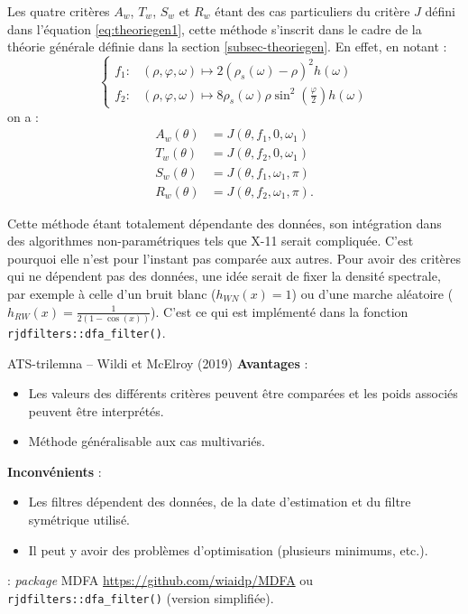 \documentclass[
  12pt,
  french,
  12pt,a4paper]{article}
\newcommand\1{\mathds{1}}
\begin{document}
Les quatre critères \(A_w\), \(T_w\), \(S_w\) et \(R_w\) étant des cas particuliers du critère \(J\) défini dans l'équation \eqref{eq:theoriegen1}, cette méthode s'inscrit dans le cadre de la théorie générale définie dans la section \ref{subsec-theoriegen}.
En effet, en notant :
\[
\begin{cases}
    f_1\colon&(\rho,\varphi, \omega)\mapsto2\left(\rho_s(\omega)-\rho\right)^{2}h(\omega) \\
    f_2\colon&(\rho,\varphi, \omega)\mapsto8\rho_s(\omega)\rho\sin^{2}\left(\frac{\varphi}{2}\right)h(\omega)
\end{cases}
\]
on a :
\begin{align*}
A_w(\theta)&= J(\theta,f_1,0,\omega_1)\\
T_w(\theta)&= J(\theta,f_2,0,\omega_1)\\
S_w(\theta)&= J(\theta,f_1,\omega_1,\pi)\\
R_w(\theta)&= J(\theta,f_2,\omega_1,\pi).
\end{align*}

Cette méthode étant totalement dépendante des données, son intégration dans des algorithmes non-paramétriques tels que X-11 serait compliquée.
C'est pourquoi elle n'est pour l'instant pas comparée aux autres.
Pour avoir des critères qui ne dépendent pas des données, une idée serait de fixer la densité spectrale, par exemple à celle d'un bruit blanc (\(h_{WN}(x)=1\)) ou d'une marche aléatoire (\(h_{RW}(x)=\frac{1}{2(1-\cos(x))}\)).
C'est ce qui est implémenté dans la fonction \texttt{rjdfilters::dfa\_filter()}.

\begin{summary_box}{ATS-trilemna -- Wildi et McElroy (2019)}
\textbf{Avantages} :

\begin{itemize}
\item
  Les valeurs des différents critères peuvent être comparées et les poids associés peuvent être interprétés.
\item
  Méthode généralisable aux cas multivariés.
\end{itemize}

\textbf{Inconvénients }:

\begin{itemize}
\item
  Les filtres dépendent des données, de la date d'estimation et du filtre symétrique utilisé.
\item
  Il peut y avoir des problèmes d'optimisation (plusieurs minimums, etc.).
\end{itemize}

\textbf{} : \emph{package} MDFA \url{https://github.com/wiaidp/MDFA} ou \texttt{rjdfilters::dfa\_filter()} (version simplifiée).

\end{summary_box}
\end{document}
